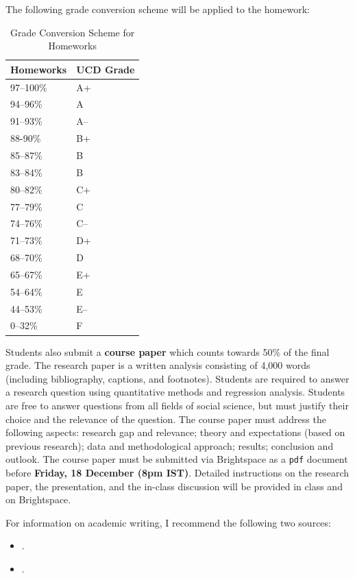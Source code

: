 \documentclass[abstract=on,parskip=full,headings=standardclasses,fontsize=11pt,paper=a4]{scrartcl}
\begin{document}
The following grade conversion scheme will be applied to the homework:


\begin{table}[h] \centering \singlespacing \footnotesize
\caption*{Grade Conversion Scheme for Homeworks}
\begin{tabular}{ l l} 
\toprule
Homeworks &  UCD Grade \\
\midrule
97--100\% & A+ \\
94--96\% & A \\
91--93\% & A-- \\
88-90\% & B+ \\
85--87\% & B \\
83--84\% & B \\
80--82\% & C+ \\
77--79\% & C \\
74--76\% & C-- \\
71--73\% & D+ \\
68--70\% & D \\
65--67\% & E+ \\
54--64\% & E \\
44--53\% & E--\\
0--32\% & F\\
\bottomrule
\end{tabular}
\end{table}



Students also submit a \textbf{course paper} which counts towards 50\% of the final grade. The research paper is a written analysis consisting of 4,000 words (including bibliography, captions, and footnotes). Students are required to  answer a research question using quantitative methods and regression analysis. Students are free to answer questions from all fields of social science, but must justify their choice and the relevance of the question. The course paper must address the following aspects: research gap and relevance; theory and expectations (based on previous research); data and methodological approach; results; conclusion and outlook. The course paper must be submitted via Brightspace as a \texttt{pdf} document before \textbf{Friday, 18 December (8pm IST)}.  Detailed instructions on the research paper, the presentation, and the in-class discussion will be provided in class and on Brightspace.

For information on academic writing, I recommend the following two sources:
\begin{itemize}
\item {}.
\item {}.
\end{itemize}
\end{document}
